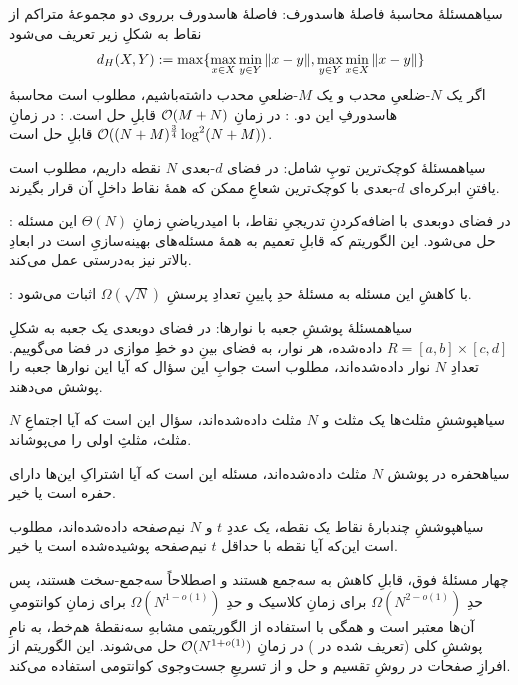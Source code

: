     ‌سیاه{مسئلهٔ محاسبهٔ فاصلهٔ هاسدورف:} فاصلهٔ هاسدورف برروی دو مجموعهٔ متراکم از نقاط به شکلِ زیر تعریف می‌شود
    \begin{equation}
        d_H(X, Y) := \max \{ \max_{x \in X} \min_{y \in Y} \norm{x - y}, \max_{y \in Y} \min_{x \in X} \norm{x - y} \}
    \end{equation}
    اگر یک $N$-ضلعیِ محدب و یک $M$-ضلعیِ محدب داشته‌باشیم، مطلوب است محاسبهٔ هاسدورفِ این دو.  
        : در زمانِ 
        $\mathcal{O}(M + N)$
        قابلِ حل است.
        : در زمانِ
        $\mathcal{O}((N+M)^{\frac{3}{4}} \log^2 (N+M))$
        قابلِ حل است.
    
    ‌سیاه{مسئلهٔ کوچک‌ترین توپِ شامل}: در فضای $d$-بعدی $N$ نقطه داریم، مطلوب است یافتنِ ابرکره‌ای $d$-بعدی با کوچک‌ترین شعاعِ ممکن که همهٔ نقاط داخلِ آن قرار بگیرند.

        : در فضای دوبعدی با اضافه‌کردنِ تدریجیِ نقاط، با امیدریاضیِ زمانِ
        $\Theta(N)$
        این مسئله حل می‌شود. این الگوریتم که قابلِ تعمیم به همهٔ مسئله‌های بهینه‌سازیِ 
        است در ابعادِ بالاتر نیز به‌درستی عمل می‌کند.

        : با کاهشِ این مسئله به مسئلهٔ 
        حدِ پایینِ تعدادِ پرسشِ
        $\Omega(\sqrt{N})$
        اثبات می‌شود.

    
   ‌سیاه{مسئلهٔ پوششِ جعبه با نوارها}: در فضای دوبعدی یک جعبه به شکلِ
    $R = [a, b] \times [c, d]$
    داده‌شده، هر نوار، به فضای بینِ دو خطِ موازی در فضا می‌گوییم. تعدادِ $N$ نوار داده‌شده‌اند، مطلوب است جوابِ این سؤال که آیا این نوارها جعبه را پوشش می‌دهند.
    
   ‌سیاه{پوششِ مثلث‌ها} یک مثلث و $N$ مثلث داد‌ه‌شده‌اند، سؤال این است که آیا اجتماعِ $N$ مثلث، مثلثِ اولی را می‌پوشاند.
   
   ‌سیاه{حفره در پوشش} $N$ مثلث داده‌شده‌اند، مسئله این است که آیا اشتراکِ این‌ها دارای حفره است یا خیر.
   
   ‌سیاه{پوششِ چندبارهٔ نقاط} یک نقطه، یک عددِ $t$ و $N$ نیم‌صفحه داده‌شده‌اند، مطلوب است این‌که آیا نقطه با حداقل $t$ نیم‌صفحه پوشیده‌شده است یا خیر.
   
   چهار مسئلهٔ فوق، قابلِ کاهش به سه‌جمع هستند و اصطلاحاً سه‌جمع-سخت هستند، پس حدِ $\Omega(N^{2 - o(1)})$ برای زمانِ کلاسیک و حدِ $\Omega(N^{1 - o(1)})$ برای زمانِ کوانتومیِ آن‌ها معتبر است  و همگی با استفاده از الگوریتمی مشابهِ سه‌نقطهٔ هم‌خط، به نامِ پوششِ کلی (تعریف شده در ) در زمانِ 
   $\mathcal{O}(N^{1 + o(1)})$
   حل می‌شوند. این الگوریتم از افرازِ صفحات در روشِ تقسیم و حل و از تسریعِ جست‌وجوی کوانتومی استفاده می‌کند. 
   
